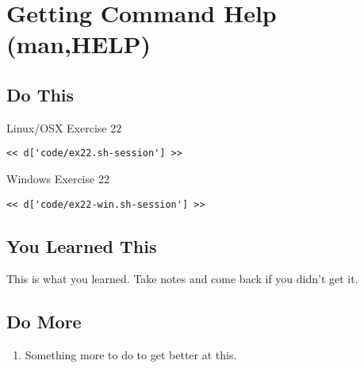 \chapter{Getting Command Help (man,HELP)}

\section{Do This}

\begin{code}{Linux/OSX Exercise 22}
\begin{Verbatim}
<< d['code/ex22.sh-session'] >>
\end{Verbatim}
\end{code}

\begin{code}{Windows Exercise 22}
\begin{Verbatim}
<< d['code/ex22-win.sh-session'] >>
\end{Verbatim}
\end{code}

\section{You Learned This}

This is what you learned.  Take notes and come back if you didn't get it.

\section{Do More}

\begin{enumerate}
\item Something more to do to get better at this.
\end{enumerate}


